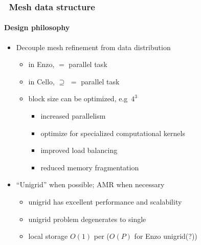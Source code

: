 \begin{frame}[fragile] 
\frametitle{\cello\ Mesh data structure}
\framesubtitle{Design philosophy}
\begin{itemize}
\small
\item Decouple mesh refinement from data distribution
  \begin{itemize}
  \item in Enzo,    $=$ parallel task 
  \item in Cello,   $\supseteq$  $=$ parallel task
  \item block size can be optimized, e.g~$4^3$
       \begin{itemize}
       \item increased parallelism
       \item optimize for specialized computational kernels
       \item improved load balancing
       \item reduced memory fragmentation
       \end{itemize}
  \end{itemize}
\item ``Unigrid'' when possible; AMR when necessary
  \begin{itemize}
  \item unigrid has excellent performance and scalability
  \item unigrid problem degenerates to single 
  \item local storage $O(1)$ per  ($O(P)$ for Enzo unigrid(?))
  \end{itemize}
\end{itemize}

\end{frame}


